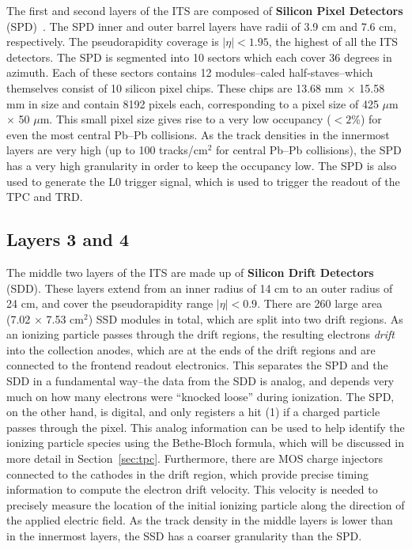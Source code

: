 The first and second layers of the ITS are composed of \textbf{Silicon Pixel Detectors} (SPD)~\cite{ITSSPD}. The SPD inner and outer barrel layers have radii of 3.9 cm and 7.6 cm, respectively. The pseudorapidity coverage is $|\eta| < 1.95$, the highest of all the ITS detectors. The SPD is segmented into 10 sectors which each cover 36 degrees in azimuth. Each of these sectors contains 12 modules--caled half-staves--which themselves consist of 10 silicon pixel chips. These chips are 13.68 mm $\times$ 15.58 mm in size and contain 8192 pixels each, corresponding to a pixel size of 425 $\mu$m $\times$ 50 $\mu$m. This small pixel size gives rise to a very low occupancy ($<2$\%) for even the most central Pb--Pb collisions.  As the track densities in the innermost layers are very high (up to 100 tracks/cm$^2$ for central Pb--Pb collisions), the SPD has a very high granularity in order to keep the occupancy low. The SPD is also used to generate the L0 trigger signal, which is used to trigger the readout of the TPC and TRD.

\subsection{Layers 3 and 4}
The middle two layers of the ITS are made up of \textbf{Silicon Drift Detectors} (SDD)\cite{ITSSDD}. These layers extend from an inner radius of 14 cm to an outer radius of 24 cm, and cover the pseudorapidity range $|\eta| < 0.9$. There are 260 large area (7.02 $\times$ 7.53 cm$^2$) SSD modules in total, which are split into two drift regions. As an ionizing particle passes through the drift regions, the resulting electrons \textit{drift} into the collection anodes, which are at the ends of the drift regions and are connected to the frontend readout electronics. This separates the SPD and the SDD in a fundamental way--the data from the SDD is analog, and depends very much on how many electrons were ``knocked loose'' during ionization. The SPD, on the other hand, is digital, and only registers a hit (1) if a charged particle passes through the pixel. This analog information can be used to help identify the ionizing particle species using the Bethe-Bloch formula, which will be discussed in more detail in Section~\ref{sec:tpc}. Furthermore, there are MOS charge injectors~\cite{MOSCharge} connected to the cathodes in the drift region, which provide precise timing information to compute the electron drift velocity. This velocity is needed to precisely measure the location of the initial ionizing particle along the direction of the applied electric field. As the track density in the middle layers is lower than in the innermost layers, the SSD has a coarser granularity than the SPD.

